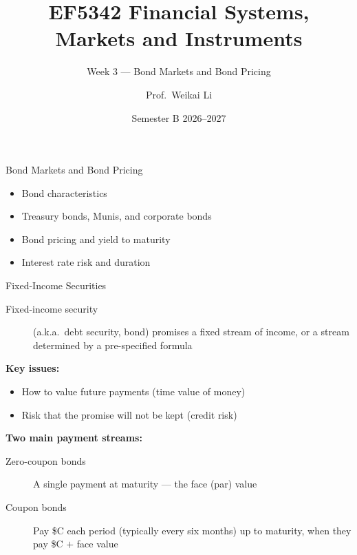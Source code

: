 \documentclass[aspectratio=169]{beamer}
\title{EF5342 Financial Systems, Markets and Instruments}
\subtitle{Week 3 --- Bond Markets and Bond Pricing}
\author{Prof.\ Weikai Li}
\institute{City University of Hong Kong}
\date{Semester B 2026--2027}
\begin{document}

\begin{frame}
\titlepage
\end{frame}

\begin{frame}{Bond Markets and Bond Pricing}
\begin{itemize}
  \item Bond characteristics
  \item Treasury bonds, Munis, and corporate bonds
  \item Bond pricing and yield to maturity
  \item Interest rate risk and duration
\end{itemize}
\end{frame}

\begin{frame}{Fixed-Income Securities}
\begin{description}
  \item[Fixed-income security] (a.k.a.\ debt security, bond) promises a fixed stream of income, or a stream determined by a pre-specified formula
\end{description}
\vspace{0.2em}
\textbf{Key issues:}
\begin{itemize}
  \item How to value future payments (time value of money)
  \item Risk that the promise will not be kept (credit risk)
\end{itemize}
\vspace{0.2em}
\textbf{Two main payment streams:}
\begin{description}
  \item[Zero-coupon bonds] A single payment at maturity --- the face (par) value
  \item[Coupon bonds] Pay \$C each period (typically every six months) up to maturity, when they pay \$C $+$ face value
\end{description}
\end{frame}
\end{document}

